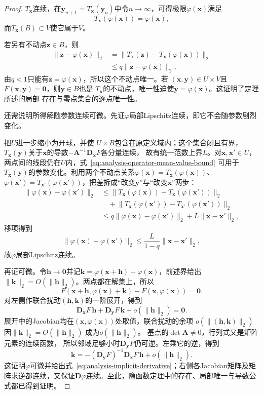 \begin{proof}
$T_{\bm x}$连续，在$\bm y_{n+1}=T_{\bm x}(\bm y_n)$中令$n\to\infty$，可得极限$\varphi(\bm x)$满足
\[
 T_{\bm x}(\varphi(\bm x))=\varphi(\bm x),
\]
而$T_{\bm x}(B)\subset V$使它属于$V$。

若另有不动点$\bm z\in B$，则
\[
 \begin{aligned}
 \lVert\bm z-\varphi(\bm x)\rVert_2
 &=\lVert T_{\bm x}(\bm z)-T_{\bm x}(\varphi(\bm x))\rVert_2\\
 &\leq q\lVert\bm z-\varphi(\bm x)\rVert_2,
 \end{aligned}
\]
由$q<1$只能有$\bm z=\varphi(\bm x)$，所以这个不动点唯一。若
$(\bm{x},\bm{y})\in U\times V$且$F(\bm{x},\bm{y})=\bm{0}$，则$\bm{y}\in B$也是
$T_{\bm{x}}$的不动点，唯一性迫使$\bm{y}=\varphi(\bm{x})$。这证明了定理所述的局部
存在与零点集合的逐点唯一性。

还需说明所得解随参数连续可微。先证$\varphi$局部Lipschitz连续，即它不会随参数剧烈变化。

把$U$进一步缩小为开球，并使
$\overline U\times B$包含在原定义域内；这个集合闭且有界，$T_{\bm x}(\bm y)$关于$\bm x$的导数$-\bm A^{-1}\bm D_{\bm x}F$各分量连续，
故有统一范数上界$L$。对$\bm x,\bm x'\in U$，
两点间的线段仍在$U$内，式~\eqref{eq:analysis-operator-mean-value-bound}
可用于$T_{\bm x}(\bm y)$的参数变化。利用两个不动点关系$\varphi(\bm x)=T_{\bm x}(\varphi(\bm x))$、$\varphi(\bm x')=T_{\bm x'}(\varphi(\bm x'))$，把差拆成“改变$\bm y$”与“改变$\bm x$”两步：
\[
 \begin{aligned}
 \lVert\varphi(\bm{x})-\varphi(\bm{x}')\rVert_2
 &\leq\lVert T_{\bm x}(\varphi(\bm x))-T_{\bm x}(\varphi(\bm x'))\rVert_2\\
 &\quad+\lVert T_{\bm x}(\varphi(\bm x'))-T_{\bm x'}(\varphi(\bm x'))\rVert_2\\
 &\leq q\lVert\varphi(\bm{x})-\varphi(\bm{x}')\rVert_2+L\lVert\bm{x}-\bm{x}'\rVert_2,
 \end{aligned}
\]
移项得到
\[
 \lVert\varphi(\bm x)-\varphi(\bm x')\rVert_2\leq\frac{L}{1-q}\lVert\bm x-\bm x'\rVert_2,
\]
故$\varphi$局部Lipschitz连续。

再证可微。令$\bm{h}\to\bm{0}$并记$\bm{k}=\varphi(\bm{x}+\bm{h})-\varphi(\bm{x})$，前述界给出$\lVert\bm{k}\rVert_2=O(\lVert\bm{h}\rVert_2)$。两点都在解集上，所以
\[
 F(\bm{x}+\bm{h},\varphi(\bm{x})+\bm{k})-F(\bm{x},\varphi(\bm{x}))=\bm{0}.
\]
对左侧作联合扰动$(\bm h,\bm k)$的一阶展开，得到
\[
 \bm{D}_{\bm{x}}F\,\bm{h}+\bm{D}_{\bm{y}}F\,\bm{k}+o(\lVert\bm{h}\rVert_2)=\bm{0}.
\]
展开中的Jacobian均在$(\bm x,\varphi(\bm x))$处取值，联合扰动的余项
$o(\lVert(\bm h,\bm k)\rVert_2)$因$\lVert\bm k\rVert_2=O(\lVert\bm h\rVert_2)$
成为$o(\lVert\bm h\rVert_2)$。
基点的$\det\bm A\neq0$，行列式又是矩阵元素的连续函数，
所以邻域足够小时$\bm D_{\bm y}F$仍可逆。左乘它的逆，得到
\[
 \bm{k}=-(\bm{D}_{\bm{y}}F)^{-1}\bm{D}_{\bm{x}}F\,\bm{h}+o(\lVert\bm{h}\rVert_2).
\]
这证明$\varphi$可微并给出式~\eqref{eq:analysis-implicit-derivative}；右侧各Jacobian矩阵及矩阵求逆都连续，又保证$\bm{D}\varphi$连续。至此，隐函数定理中的存在、局部唯一与导数公式都已得到证明。
\end{proof}

